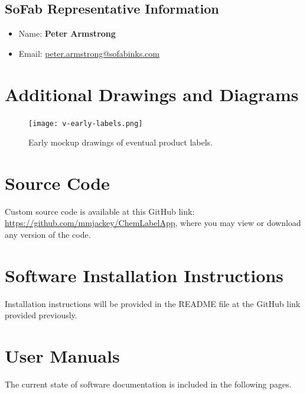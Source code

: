 \documentclass{article}
\begin{document}
\subsection{SoFab Representative Information}
\begin{itemize}
    \item Name: \textbf{Peter Armstrong}
    \item Email: \url{peter.armstrong@sofabinks.com}
\end{itemize}
\section{Additional Drawings and Diagrams}
\begin{figure}[H]
        \centering 
        \texttt{[image: v-early-labels.png]} 
        \caption{Early mockup drawings of eventual product labels.} 
\end{figure} 
\section{Source Code} 
Custom source code is available at this GitHub link: \url{https://github.com/mmjackey/ChemLabelApp},
where you may view or download any version of the code.
\section{Software Installation Instructions} 
Installation instructions will be provided in the README file at the GitHub link provided previously.
\section{User Manuals}
The current state of software documentation is included in the following pages.

\end{document}
